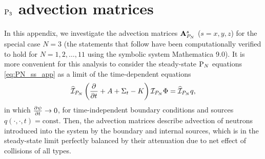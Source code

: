 \chapter{$\PN[3]$ advection matrices}\label{app:C}
In this appendix, we investigate the advection matrices $\mat{A}_{P_N}^s$ ($s = x,y,z$) for the special case $N = 3$ 
(the statements that follow have been computationally verified to hold for $N = 1,2,\ldots,11$ using the symbolic 
system Mathematica 9.0).
It is more convenient for this analysis to consider the steady-state $\PN$ equations \eqref{eq:PN_ss_app} as a limit
of the time-dependent equations
\begin{equation}\label{eq:PN_ss_app}
	\PihPN \left(\pd{}{t} + A + \Sigma_t - K\right) \PiPN\Phi = \PihPN q,
\end{equation}
in which $\pd{\psi}{t} \to 0$, for time-independent boundary conditions and sources
\linebreak[4]\mbox{$q(\cdot,\cdot,t) = \text{const}$}.
Then, the advection matrices describe advection of neutrons introduced into the system by the boundary and internal
sources, which is in the steady-state limit perfectly balanced by their attenuation due to net effect of collisions of
all types.

